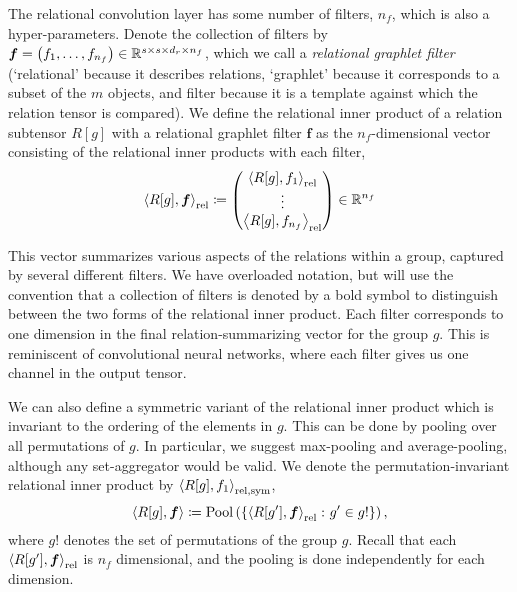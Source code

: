The relational convolution layer has some number of filters, $n_f$, which is also a hyper-parameters. Denote the collection of filters by $\boldsymbol{f} = \left(f_1, \ldots, f_{n_f}\right) \in \mathbb{R}^{s \times s \times d_r \times n_f}$, which we call a \textit{relational graphlet filter} (`relational' because it describes relations, `graphlet' because it corresponds to a subset of the $m$ objects, and filter because it is a template against which the relation tensor is compared). We define the relational inner product of a relation subtensor $R[g]$ with a relational graphlet filter $\bm{f}$ as the $n_f$-dimensional vector consisting of the relational inner products with each filter,
\begin{equation}
    \label{eq:relational_inner_prod}
    \left\langle R[g], \bm{f} \right\rangle_\mathrm{rel} \coloneq \begin{pmatrix} \left\langle R[g], f_1 \right\rangle_\mathrm{rel} \\ \vdots 
 \\ \left\langle R[g], f_{n_f} \right\rangle_\mathrm{rel} \end{pmatrix} \in \mathbb{R}^{n_f}
\end{equation}

This vector summarizes various aspects of the relations within a group, captured by several different filters. We have overloaded notation, but will use the convention that a collection of filters is denoted by a bold symbol to distinguish between the two forms of the relational inner product. Each filter corresponds to one dimension in the final relation-summarizing vector for the group $g$. This is reminiscent of convolutional neural networks, where each filter gives us one channel in the output tensor.

We can also define a symmetric variant of the relational inner product which is invariant to the ordering of the elements in $g$. This can be done by pooling over all permutations of $g$. In particular, we suggest max-pooling and average-pooling, although any set-aggregator would be valid. We denote the permutation-invariant relational inner product by $\left \langle R[g], f_1 \right\rangle_{\mathrm{rel}, \mathrm{sym}}$,
\begin{equation}\label{eq:symmetric_relational_inner_prod}
    \left \langle R[g], \bm{f} \right\rangle \coloneq \mathrm{Pool}\left(\left\{\left\langle R[g'], \bm{f} \right\rangle_\mathrm{rel} \colon g' \in g!\right\}\right),
\end{equation}
\noindent where $g!$ denotes the set of permutations of the group $g$. Recall that each $\left \langle R[g'], \bm{f} \right\rangle_{\mathrm{rel}}$ is $n_f$ dimensional, and the pooling is done independently for each dimension.

